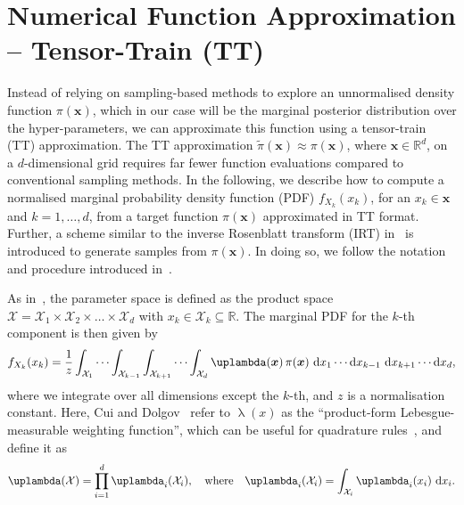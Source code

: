 \section{Numerical Function Approximation -- Tensor-Train (TT)}
\label{sec:tensortrain}
Instead of relying on sampling-based methods to explore an unnormalised density function $\pi(\bm{x})$, which in our case will be the marginal posterior distribution over the hyper-parameters, we can approximate this function using a tensor-train (TT) approximation.
The TT approximation $\tilde{\pi}(\bm{x}) \approx \pi(\bm{x})$, where $\bm{x} \in \mathbb{R}^d$, on a $d$-dimensional grid requires far fewer function evaluations compared to conventional sampling methods.
In the following, we describe how to compute a normalised marginal probability density function (PDF) $f_{X_k}(x_k)$, for an $x_k \in \bm{x}$ and $k = 1, \dots,d$, from a target function $\pi(\bm{x})$ approximated in TT format.
Further, a scheme similar to the inverse Rosenblatt transform (IRT) in~\cite{dolgov2020approximation} is introduced to generate samples from $\pi(\bm{x})$.
In doing so, we follow the notation and procedure introduced in~\cite{cui2022deep}.


As in~\cite{cui2022deep}, the parameter space is defined as the product space $\mathcal{X} = \mathcal{X}_1 \times \mathcal{X}_2 \times \dots \times \mathcal{X}_d$ with $ x_k \in \mathcal{X}_k \subseteq \mathbb{R}$.
The marginal PDF for the $k$-th component is then given by
\begin{align}
	f_{X_k}(x_k) = \frac{1}{z} \int_{\mathcal{X}_1} \cdots \int_{\mathcal{X}_{k-1}} \int_{\mathcal{X}_{k+1}} \cdots  \int_{\mathcal{X}_d} \uplambda(\bm{x}) \, \pi(\bm{x}) \, \diff x_1 \cdots \diff x_{k-1} \, \diff x_{k+1} \cdots \diff x_d, \label{eq:margInt}
\end{align}
where we integrate over all dimensions except the $k$-th, and $z$ is a normalisation constant.
Here, Cui and Dolgov~\cite{cui2022deep} refer to $\uplambda(x)$ as the ``product-form Lebesgue-measurable weighting function'', which can be useful for quadrature rules~\cite{davis2007methods}, and define it as
\begin{align}
	\uplambda(\mathcal{X}) = \prod_{i = 1}^{d} \uplambda_i(\mathcal{X}_i), \quad \text{where} \quad \uplambda_i(\mathcal{X}_i) = \int_{\mathcal{X}_i} \uplambda_i(x_i) \, \diff x_i. \label{eq:lebesgueWeight}
\end{align}

